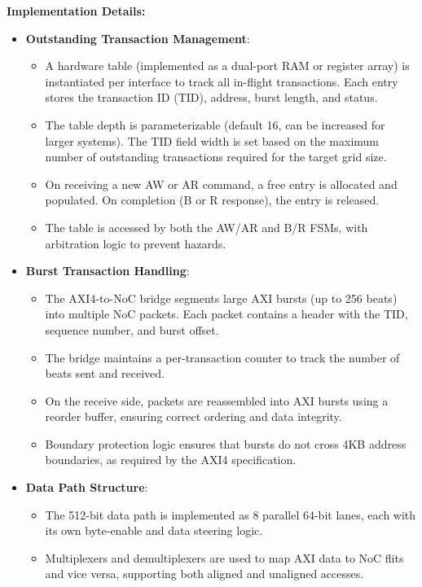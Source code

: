 \documentclass[11pt,a4paper]{article}
\begin{document}
\textbf{Implementation Details:}
\begin{itemize}
    \item \textbf{Outstanding Transaction Management}: 
    \begin{itemize}
        \item A hardware table (implemented as a dual-port RAM or register array) is instantiated per interface to track all in-flight transactions. Each entry stores the transaction ID (TID), address, burst length, and status.
        \item The table depth is parameterizable (default 16, can be increased for larger systems). The TID field width is set based on the maximum number of outstanding transactions required for the target grid size.
        \item On receiving a new AW or AR command, a free entry is allocated and populated. On completion (B or R response), the entry is released.
        \item The table is accessed by both the AW/AR and B/R FSMs, with arbitration logic to prevent hazards.
    \end{itemize}
    \item \textbf{Burst Transaction Handling}:
    \begin{itemize}
        \item The AXI4-to-NoC bridge segments large AXI bursts (up to 256 beats) into multiple NoC packets. Each packet contains a header with the TID, sequence number, and burst offset.
        \item The bridge maintains a per-transaction counter to track the number of beats sent and received.
        \item On the receive side, packets are reassembled into AXI bursts using a reorder buffer, ensuring correct ordering and data integrity.
        \item Boundary protection logic ensures that bursts do not cross 4KB address boundaries, as required by the AXI4 specification.
    \end{itemize}
    \item \textbf{Data Path Structure}:
    \begin{itemize}
        \item The 512-bit data path is implemented as 8 parallel 64-bit lanes, each with its own byte-enable and data steering logic.
        \item Multiplexers and demultiplexers are used to map AXI data to NoC flits and vice versa, supporting both aligned and unaligned accesses.

\end{itemize}
\end{itemize}
\end{document}
